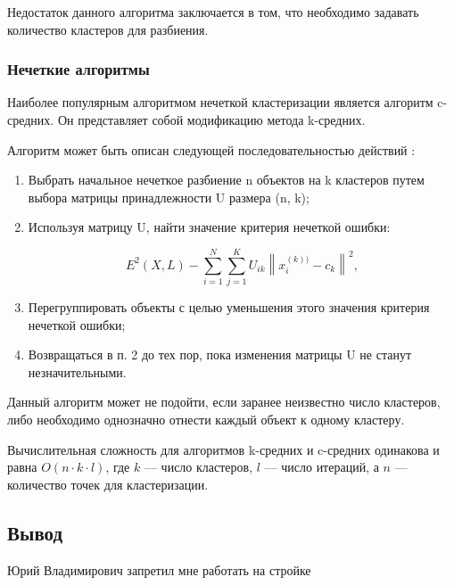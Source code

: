Недостаток данного алгоритма заключается в том, что необходимо задавать количество кластеров для разбиения. \cite{clasters}

\subsubsection{Нечеткие алгоритмы}
Наиболее популярным алгоритмом нечеткой кластеризации является алгоритм c-средних. Он представляет собой модификацию метода k-средних. \cite{clasters}

Алгоритм может быть описан следующей последовательностью действий \cite{clasters}:

\begin{enumerate}[leftmargin=1.6\parindent]
\item Выбрать начальное нечеткое разбиение n объектов на k кластеров путем выбора матрицы принадлежности U размера (n, k);
\item Используя матрицу U, найти значение критерия нечеткой ошибки:

\begin{equation}
\label{eq:e22}
E^2(X,L)-\sum_{i=1}^N\sum_{j=1}^KU_{ik}\left \|x_i^{(k))}-c_k  \right \|^2,
\end{equation}
\item Перегруппировать объекты с целью уменьшения этого значения критерия нечеткой ошибки;
\item Возвращаться в п. 2 до тех пор, пока изменения матрицы U не станут незначительными.
\end{enumerate}

Данный алгоритм может не подойти, если заранее неизвестно число кластеров, либо необходимо однозначно отнести каждый объект к одному кластеру. \cite{clasters}

Вычислительная сложность для алгоритмов k-средних и c-средних одинакова и равна $O(n \cdot k \cdot l)$, где $k$ --- число кластеров, $l$ --- число итераций, а $n$ --- количество точек для кластеризации. \cite{clasters}


\subsection*{Вывод}
Юрий Владимирович запретил мне работать на стройке

\pagebreak